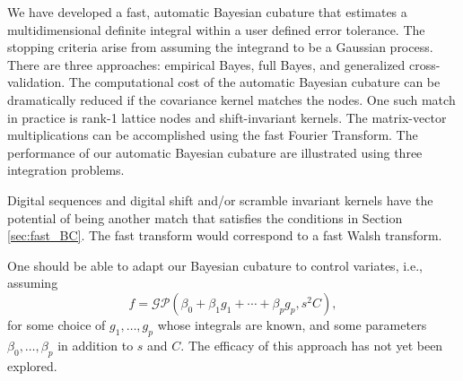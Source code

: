 \documentclass[twocolumn]{svjour3}          %
\begin{document}
We have developed a fast, automatic Bayesian cubature that estimates a multidimensional definite integral within a user defined error tolerance.  The stopping criteria arise from assuming the integrand to be a Gaussian process.  There are three approaches:  empirical Bayes, full Bayes, and generalized cross-validation.  The computational cost of the automatic Bayesian cubature can be dramatically reduced if the covariance kernel matches the nodes.  One such match in practice is rank-1 lattice nodes and shift-invariant kernels.  The matrix-vector multiplications can be accomplished using the fast Fourier Transform.  The performance of our automatic Bayesian cubature are illustrated using three integration problems.  

Digital sequences and digital shift and/or scramble invariant kernels have the potential of being another match that satisfies the conditions in Section \ref{sec:fast_BC}.  The fast transform would correspond to a fast Walsh transform.  


One should be able to adapt our Bayesian cubature to control variates, i.e., assuming  
\begin{equation*}
f = \mathcal{GP} \left( \beta_0 + \beta_1 g_1 + \cdots + \beta_p g_p, s^2 C \right),
\end{equation*}
for some choice of $g_1, \ldots, g_p$ whose integrals are known, and some parameters $\beta_0, \ldots, \beta_p$ in addition to $s$ and $C$.  The efficacy of this approach has not yet been explored.















\iffalse
\end{document}

